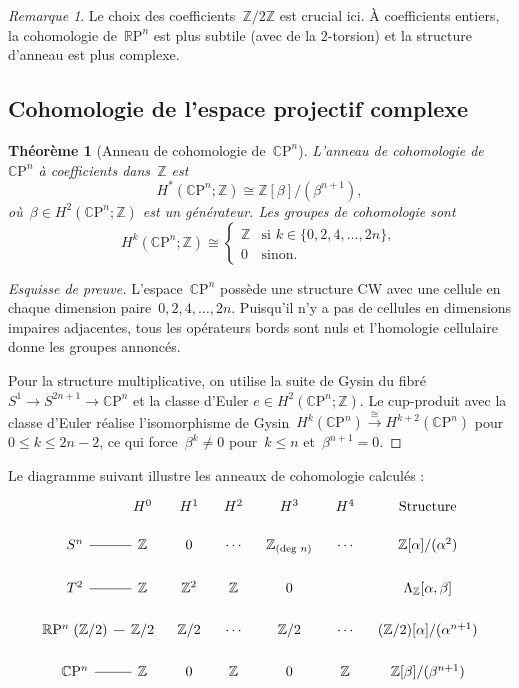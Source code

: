 \documentclass[12pt,a4paper,openany]{book}
\theoremstyle{definition}
\theoremstyle{plain}
\newtheorem{theoreme}[definition]{Théorème}
\theoremstyle{remark}
\newtheorem{remarque}[definition]{Remarque}
\newcommand{\Z}{\mathbb{Z}}
\newcommand{\RP}{\mathbb{R}\mathrm{P}}
\newcommand{\CP}{\mathbb{C}\mathrm{P}}
\begin{document}
\begin{remarque}\label{rem:rpn-Z2-essentiel}
Le choix des coefficients~$\Z/2\Z$ est crucial ici. À coefficients entiers, la
cohomologie de~$\RP^n$ est plus subtile (avec de la $2$-torsion) et la structure
d'anneau est plus complexe.
\end{remarque}

\subsection{Cohomologie de l'espace projectif complexe}\label{subsec:cohomologie-cpn}
\index{$\CP^n$!cohomologie}

\begin{theoreme}[Anneau de cohomologie de~$\CP^n$]\label{thm:cohomologie-cpn}
L'anneau de cohomologie de~$\CP^n$ à coefficients dans~$\Z$ est
\[
  H^*(\CP^n; \Z) \cong \Z[\beta]/(\beta^{n+1}),
\]
où~$\beta \in H^2(\CP^n; \Z)$ est un générateur. Les groupes de cohomologie sont
\[
  H^k(\CP^n; \Z) \cong
  \begin{cases}
    \Z & \text{si } k \in \{0, 2, 4, \ldots, 2n\},\\
    0  & \text{sinon.}
  \end{cases}
\]
\end{theoreme}

\begin{proof}[Esquisse de preuve]
L'espace~$\CP^n$ possède une structure CW avec une cellule en chaque dimension
paire~$0, 2, 4, \ldots, 2n$. Puisqu'il n'y a pas de cellules en dimensions impaires
adjacentes, tous les opérateurs bords sont nuls et l'homologie cellulaire donne les
groupes annoncés.

Pour la structure multiplicative, on utilise la suite de Gysin
du fibré~$S^1 \to S^{2n+1} \to \CP^n$ et la classe d'Euler
$e \in H^2(\CP^n;\Z)$. Le cup-produit avec la classe d'Euler réalise l'isomorphisme
de Gysin~$H^k(\CP^n) \xrightarrow{\cong} H^{k+2}(\CP^n)$ pour~$0 \leqslant k \leqslant 2n-2$,
ce qui force~$\beta^k \neq 0$ pour~$k \leqslant n$ et~$\beta^{n+1} = 0$.
\end{proof}

Le diagramme suivant illustre les anneaux de cohomologie calculés :
\[
\begin{tikzcd}[row sep=1.2em, column sep=0.8em]
  & H^0 & H^1 & H^2 & H^3 & H^4 & \text{Structure} \\
  S^n \ar[dash]{r} & \Z & 0 & \cdots & \Z_{\text{(deg }n\text{)}} & \cdots
    & \Z[\alpha]/(\alpha^2) \\
  T^2 \ar[dash]{r} & \Z & \Z^2 & \Z & 0 &
    & \Lambda_\Z[\alpha,\beta] \\
  \RP^n\; (\Z/2) \ar[dash]{r} & \Z/2 & \Z/2 & \cdots & \Z/2 & \cdots
    & (\Z/2)[\alpha]/(\alpha^{n+1}) \\
  \CP^n \ar[dash]{r} & \Z & 0 & \Z & 0 & \Z
    & \Z[\beta]/(\beta^{n+1})
\end{tikzcd}
\]
\end{document}
